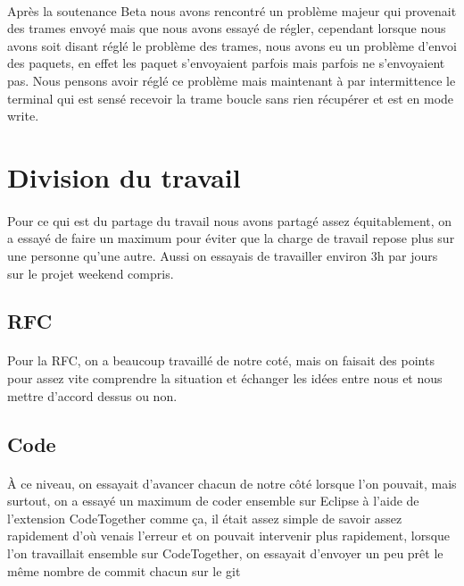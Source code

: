 \documentclass[a4paper,titlepage]{report}
\begin{document}
\paragraph{}
Après la soutenance Beta nous avons rencontré un problème majeur qui provenait des trames envoyé mais que nous avons essayé de régler, cependant lorsque nous avons soit disant réglé le problème des trames, nous avons eu un problème d'envoi des paquets, en effet les paquet s'envoyaient parfois mais parfois ne s'envoyaient pas.
Nous pensons avoir réglé ce problème mais maintenant à par intermittence le terminal qui est sensé recevoir la trame boucle sans rien récupérer et est en mode write.






\pagebreak
\section{Division du travail}
\paragraph{}
Pour ce qui est du partage du travail nous avons partagé assez équitablement, on a essayé de faire un maximum pour éviter que la charge de travail repose plus sur une personne qu'une autre. Aussi on essayais de travailler environ 3h par jours sur le projet weekend compris.
\subsection{RFC}
\paragraph{}
Pour la RFC, on a beaucoup travaillé de notre coté, mais on faisait des points pour assez vite comprendre la situation et échanger les idées entre nous et nous mettre d'accord dessus ou non.
\subsection{Code}
\paragraph{}
À ce niveau, on essayait d'avancer chacun de notre côté lorsque l'on pouvait, mais surtout, on a essayé un maximum de coder ensemble sur Eclipse à l'aide de l'extension CodeTogether comme ça, il était assez simple de savoir assez rapidement d'où venais l'erreur et on pouvait intervenir plus rapidement, lorsque l'on travaillait ensemble sur CodeTogether, on essayait d'envoyer un peu prêt le même nombre de commit chacun sur le git
\end{document}
